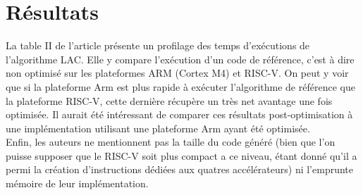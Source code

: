 \documentclass[10pt,a4paper]{article}
\begin{document}
\section{Résultats}
La table II de l'article présente un profilage des temps d'exécutions de l'algorithme LAC. Elle y compare l'exécution d'un code de référence, c'est à dire non optimisé sur les plateformes
 ARM (Cortex M4) et RISC-V. On peut y voir que si la plateforme Arm est plus rapide à exécuter l'algorithme de référence que la plateforme RISC-V, cette dernière récupère un très net avantage 
une fois optimisée. Il aurait été intéressant de comparer ces résultats post-optimisation à une implémentation utilisant une plateforme Arm ayant été optimisée.\\
Enfin, les auteurs ne mentionnent pas la taille du code généré (bien que l'on puisse supposer que le RISC-V soit plus compact a ce niveau, étant donné qu'il a permi la création d'instructions 
dédiées aux quatres accélérateurs) ni l'emprunte mémoire de leur implémentation.
\end{document}
